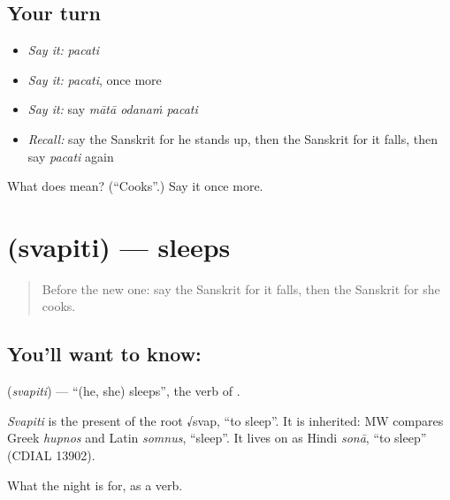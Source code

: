\subsection*{Your turn}
\begin{itemize}
\raggedright
  \item \emph{Say it:} \emph{pacati}
  \item \emph{Say it:} \emph{pacati}, once more
  \item \emph{Say it:} say \emph{mātā odanaṁ pacati}
  \item \emph{Recall:} say the Sanskrit for he stands up, then the Sanskrit for it falls, then say \emph{pacati} again
\end{itemize}

\begin{tcolorbox}[breakable,colback=teal!4,colframe=teal!35!black,title={Before you move on}]
What does  mean? (\textquotedblleft{}Cooks\textquotedblright{}.) Say it once more.
\end{tcolorbox}
\section[\texorpdfstring{\sk{स्वपिति} (svapiti)}{स्वपिति (svapiti)}]{ (svapiti) — sleeps}

\label{lesson:SA-C72-sleeps}



\begin{quote}
Before the new one: say the Sanskrit for it falls, then the Sanskrit for she cooks.
\end{quote}

\subsection*{You'll want to know: }
\textbf{} (\emph{svapiti}) — \textquotedblleft{}(he, she) sleeps\textquotedblright{}, the verb of \textbf{}.

\begin{cousinweb}
\emph{Svapiti} is the present of the root √svap, \textquotedblleft{}to sleep\textquotedblright{}. It is inherited: MW compares Greek \emph{hupnos} and Latin \emph{somnus}, \textquotedblleft{}sleep\textquotedblright{}. It lives on as Hindi \emph{sonā}, \textquotedblleft{}to sleep\textquotedblright{} (CDIAL 13902).
\end{cousinweb}

\begin{grammarlens}[title={What you've built}]
What the night is for, as a verb.
\end{grammarlens}

